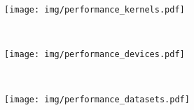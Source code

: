 \begin{subfigure}[h]{\textwidth}
  \centering
  \texttt{[image: img/performance\_kernels.pdf]}
  \vspace{-1.5em} %
  \caption{}
  \label{fig:performance-kernels}
\end{subfigure}
\\
\begin{subfigure}[h]{.48\textwidth}
  \centering
  \texttt{[image: img/performance\_devices.pdf]}
  \vspace{-1.5em} %
  \caption{}
  \label{fig:performance-devices}
\end{subfigure}
~%
\begin{subfigure}[h]{.48\textwidth}
  \centering
  \texttt{[image: img/performance\_datasets.pdf]}
  \vspace{-1.5em} %
  \caption{}
  \label{fig:performance-datasets}
\end{subfigure}
